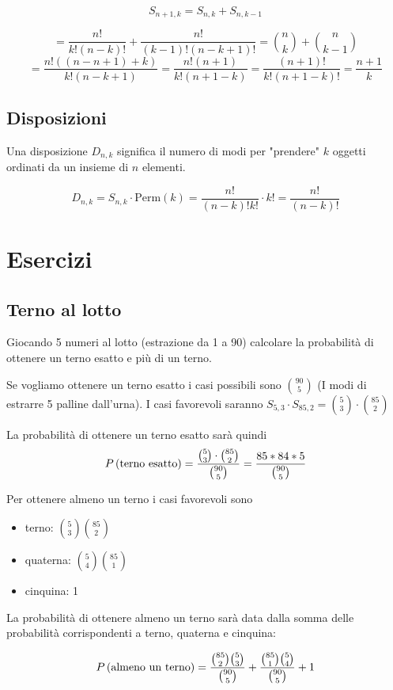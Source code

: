\[ S_{n+1,k} = S_{n,k} + S_{n,k-1} \]

\[ = \dfrac{n!}{k!(n-k)!} + \dfrac{n!}{(k-1)!(n-k+1)!} = \binom{n}{k} + \binom{n}{k-1} \]
\[ = \dfrac{n!((n-n+1) + k)}{k!(n-k+1)} = \dfrac{n!(n+1)}{k!(n+1-k)} = \dfrac{(n+1)!}{k!(n+1-k)!} = \dfrac{n+1}{k} \]
\enddim

\subsection{Disposizioni}
Una disposizione $ D_{n,k} $ significa il numero di modi per "prendere" $ k $ oggetti ordinati da un insieme di $ n $ elementi.

\[ D_{n,k} = S_{n,k} \cdot \text{Perm}(k) = \dfrac{n!}{(n-k)!k!} \cdot k! = \dfrac{n!}{(n-k)!} \]

\section{Esercizi}

\subsection{Terno al lotto}
Giocando 5 numeri al lotto (estrazione da 1 a 90) calcolare la probabilità di ottenere un terno esatto e più di un terno.

Se vogliamo ottenere un terno esatto i casi possibili sono $ \binom{90}{5} $ (I modi di estrarre 5 palline dall'urna). I casi favorevoli saranno $ S_{5,3} \cdot S_{85,2} = \binom{5}{3} \cdot \binom{85}{2}$

La probabilità di ottenere un terno esatto sarà quindi
\[ P\left(\text{terno esatto}\right) = \dfrac{\binom{5}{3} \cdot \binom{85}{2}}{\binom{90}{5}} = \dfrac{85 * 84 * 5}{\binom{90}{5}} \]

Per ottenere almeno un terno i casi favorevoli sono
\begin{itemize}
	\item terno: $ \binom{5}{3} \binom{85}{2} $
	\item quaterna: $ \binom{5}{4} \binom{85}{1} $
	\item cinquina: 1
\end{itemize}

La probabilità di ottenere almeno un terno sarà data dalla somma delle probabilità corrispondenti a terno, quaterna e cinquina:

\[ P\left(\text{almeno un terno}\right) = \dfrac{\binom{85}{2} \binom{5}{3}}{\binom{90}{5}} + \dfrac{\binom{85}{1} \binom{5}{4}}{\binom{90}{5}} + 1 \]

